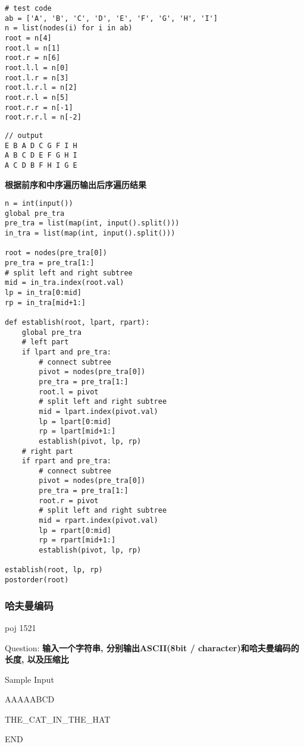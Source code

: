 \documentclass[../main]{subfiles}
\begin{document}
\begin{lstlisting}[style = Python]
# test code
ab = ['A', 'B', 'C', 'D', 'E', 'F', 'G', 'H', 'I']
n = list(nodes(i) for i in ab)
root = n[4]
root.l = n[1]
root.r = n[6]
root.l.l = n[0]
root.l.r = n[3]
root.l.r.l = n[2]
root.r.l = n[5]
root.r.r = n[-1]
root.r.r.l = n[-2]
\end{lstlisting}

\begin{lstlisting}[style = Pseudocode]
// output
E B A D C G F I H 
A B C D E F G H I 
A C D B F H I G E 
\end{lstlisting}

\newpage
\textbf{根据前序和中序遍历输出后序遍历结果}
\begin{lstlisting}[style = Python]
n = int(input())
global pre_tra
pre_tra = list(map(int, input().split()))
in_tra = list(map(int, input().split()))

root = nodes(pre_tra[0])
pre_tra = pre_tra[1:]
# split left and right subtree
mid = in_tra.index(root.val)
lp = in_tra[0:mid]
rp = in_tra[mid+1:]

def establish(root, lpart, rpart):
    global pre_tra
    # left part
    if lpart and pre_tra:
        # connect subtree
        pivot = nodes(pre_tra[0])
        pre_tra = pre_tra[1:]
        root.l = pivot
        # split left and right subtree
        mid = lpart.index(pivot.val)
        lp = lpart[0:mid]
        rp = lpart[mid+1:]
        establish(pivot, lp, rp)
    # right part
    if rpart and pre_tra:
        # connect subtree
        pivot = nodes(pre_tra[0])
        pre_tra = pre_tra[1:]
        root.r = pivot
        # split left and right subtree
        mid = rpart.index(pivot.val)
        lp = rpart[0:mid]
        rp = rpart[mid+1:]
        establish(pivot, lp, rp)

establish(root, lp, rp)
postorder(root)
\end{lstlisting}

\subsubsection{哈夫曼编码}

poj 1521

Question:
\textbf{输入一个字符串, 分别输出ASCII(8bit / character)和哈夫曼编码的长度, 以及压缩比}

Sample Input

AAAAABCD

THE\_CAT\_IN\_THE\_HAT

END
\end{document}
